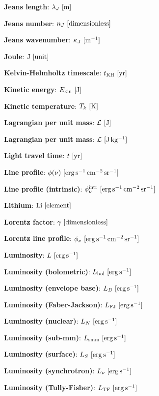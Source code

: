 \documentclass[a4paper,10pt]{article}
\begin{document}
{\noindent}\textbf{Jeans length}: $\lambda_J ~ [{\rm m}]$

{\noindent}\textbf{Jeans number}: $n_J ~ [{\rm dimensionless}]$

{\noindent}\textbf{Jeans wavenumber}: $\kappa_J ~ [{\rm m^{-1}}]$

{\noindent}\textbf{Joule}: ${\rm J} ~ [{\rm unit}]$

{\noindent}\textbf{Kelvin-Helmholtz timescale}: $t_{\rm KH} ~ [{\rm yr}]$

{\noindent}\textbf{Kinetic energy}: $E_\mathrm{kin} ~ [{\rm J}]$

{\noindent}\textbf{Kinetic temperature}: $T_k ~ [{\rm K}]$

{\noindent}\textbf{Lagrangian per unit mass}: $\mathcal{L} ~ [{\rm J}]$

{\noindent}\textbf{Lagrangian per unit mass}: $\mathcal{L} ~ [{\rm J\,kg^{-1}}]$

{\noindent}\textbf{Light travel time}: $t ~ [{\rm yr}]$

{\noindent}\textbf{Line profile}: $\phi(\nu) ~ [{\rm erg\,s^{-1}\,cm^{-2}\,sr^{-1}}]$

{\noindent}\textbf{Line profile (intrinsic)}: $\phi_\nu^{\rm intr} ~ [{\rm erg\,s^{-1}\,cm^{-2}\,sr^{-1}}]$

{\noindent}\textbf{Lithium}: ${\rm Li} ~ [{\rm element}]$

{\noindent}\textbf{Lorentz factor}: $\gamma ~ [{\rm dimensionless}]$

{\noindent}\textbf{Lorentz line profile}: $\phi_\nu ~ [{\rm erg\,s^{-1}\,cm^{-2}\,sr^{-1}}]$

{\noindent}\textbf{Luminosity}: $L ~ [{\rm erg\,s^{-1}}]$

{\noindent}\textbf{Luminosity (bolometric)}: $L_{\rm bol} ~ [{\rm erg\,s^{-1}}]$

{\noindent}\textbf{Luminosity (envelope base)}: $L_B ~ [{\rm erg\,s^{-1}}]$

{\noindent}\textbf{Luminosity (Faber-Jackson)}: $L_\mathrm{FJ} ~ [{\rm erg\,s^{-1}}]$

{\noindent}\textbf{Luminosity (nuclear)}: $L_N ~ [{\rm erg\,s^{-1}}]$

{\noindent}\textbf{Luminosity (sub-mm)}: $L_{\rm smm} ~ [{\rm erg\,s^{-1}}]$

{\noindent}\textbf{Luminosity (surface)}: $L_S ~ [{\rm erg\,s^{-1}}]$

{\noindent}\textbf{Luminosity (synchrotron)}: $L_\nu ~ [{\rm erg\,s^{-1}}]$

{\noindent}\textbf{Luminosity (Tully-Fisher)}: $L_\mathrm{TF} ~ [{\rm erg\,s^{-1}}]$
\end{document}
